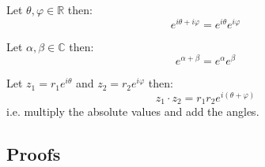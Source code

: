 \begin{thm}
	Let $\theta, \varphi \in \mathbb{R}$ then:
	\[e^{i\theta + i\varphi} = e^{i\theta}e^{i\varphi}\]
\end{thm}
\begin{thm}
	Let $\alpha, \beta \in \mathbb{C}$ then:
	\[e^{\alpha + \beta} = e^{\alpha}e^{\beta}\]
\end{thm}
\begin{thm}
	Let $z_1 = r_1 e^{i\theta}$ and $z_2 = r_2 e^{i\varphi}$ then:
	\[z_1 \cdot z_2 = r_1 r_2 e^{i(\theta + \varphi)} \]
	i.e. multiply the absolute values and add the angles.
\end{thm}


\subsection{Proofs}
